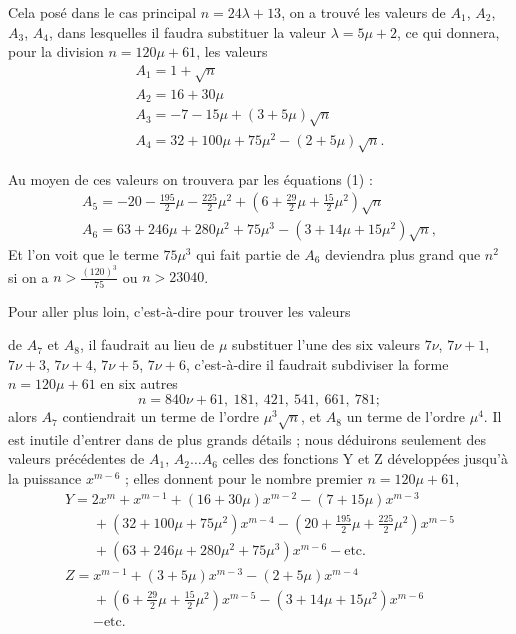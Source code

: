 \documentclass[11pt,a4paper]{article}
\begin{document}
Cela posé dans le cas principal $n = 24\lambda + 13$, on a trouvé les
valeurs de $A_1$, $A_2$, $A_3$, $A_4$, dans lesquelles il faudra substituer
la valeur $\lambda = 5\mu + 2$, ce qui donnera, pour la division
$n = 120\mu + 61$, les valeurs
\[
\begin{array}{l}
A_1 = 1 + \sqrt{n} \\
A_2 = 16 + 30\mu \\
A_3 = -7 - 15\mu + (3 + 5\mu)\sqrt{n} \\
A_4 = 32 + 100\mu + 75\mu^2 - (2 + 5\mu)\sqrt{n}.
\end{array}
\]

Au moyen de ces valeurs on trouvera par les équations (1) :
\[
\begin{array}{l}
A_5 = -20 - \frac{195}{2}\mu - \frac{225}{2}\mu^2 + \left(6 + \frac{29}{2}\mu + \frac{15}{2}\mu^2\right)\sqrt{n} \\
A_6 = 63 + 246\mu + 280\mu^2 + 75\mu^3 - (3 + 14\mu + 15\mu^2)\sqrt{n},
\end{array}
\]
Et l'on voit que le terme $75\mu^3$ qui fait partie de $A_6$ deviendra plus
grand que $n^2$ si on a $n > \frac{(120)^3}{75}$ ou $n > 23040$.

Pour aller plus loin, c'est-à-dire pour trouver les valeurs


de $A_7$ et $A_8$, il faudrait au lieu de $\mu$ substituer l'une des six
valeurs $7\nu$, $7\nu + 1$, $7\nu + 3$, $7\nu + 4$, $7\nu + 5$, $7\nu + 6$,
c'est-à-dire il faudrait subdiviser la forme $n = 120\mu + 61$ en six autres
\[
n = 840\nu + 61,\ 181,\ 421,\ 541,\ 661,\ 781 ;
\]
alors $A_7$ contiendrait un terme de l'ordre $\mu^3\sqrt{n}$, et $A_8$ un
terme de l'ordre $\mu^4$. Il est inutile d'entrer dans de plus grands
détails ; nous déduirons seulement des valeurs précédentes de
$A_1$, $A_2 \ldots A_6$ celles des fonctions Y et Z développées jusqu'à la
puissance $x^{m-6}$ ; elles donnent pour le nombre premier $n = 120\mu + 61$,
\[
\begin{array}{l}
Y = 2x^m + x^{m-1} + (16 + 30\mu)x^{m-2} - (7 + 15\mu)x^{m-3} \\
\qquad + (32 + 100\mu + 75\mu^2)x^{m-4} - \left(20 + \frac{195}{2}\mu + \frac{225}{2}\mu^2\right)x^{m-5} \\
\qquad + (63 + 246\mu + 280\mu^2 + 75\mu^3)x^{m-6} - \text{etc.} \\
Z = x^{m-1} + (3 + 5\mu)x^{m-3} - (2 + 5\mu)x^{m-4} \\
\qquad + \left(6 + \frac{29}{2}\mu + \frac{15}{2}\mu^2\right)x^{m-5} - (3 + 14\mu + 15\mu^2)x^{m-6} \\
\qquad - \text{etc.}
\end{array}
\]
\end{document}

